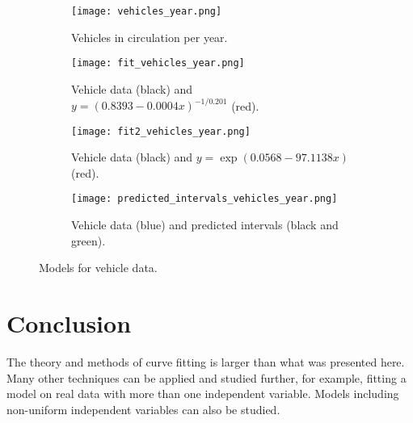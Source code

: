 \documentclass[letterpaper, 10 pt, conference]{article}
\begin{document}
\begin{figure}
	\centering
	\begin{subfigure}{.45 \linewidth}
		\centering
		\texttt{[image: vehicles\_year.png]}
		\caption{Vehicles in circulation per year.}
		\label{fig:vehicles}
	\end{subfigure}
	\hfill
	\begin{subfigure}{0.45\linewidth}
		\texttt{[image: fit\_vehicles\_year.png]}
		\caption{Vehicle data (black) and $y = (0.8393 - 0.0004 x)^{-1/0.201}$ (red).}
		\label{fig:fit_vehicles}
	\end{subfigure}
	\hfill
	\begin{subfigure}{0.45\linewidth}
		\texttt{[image: fit2\_vehicles\_year.png]}
		\caption{Vehicle data (black) and $y = \exp(0.0568 - 97.1138x)$ (red).}
		\label{fig:fit2_vehicles}
	\end{subfigure}
	\hfill
	\begin{subfigure}{0.45\linewidth}
		\texttt{[image: predicted\_intervals\_vehicles\_year.png]}
		\caption{Vehicle data (blue) and predicted intervals (black and green).}
		\label{fig:predicted_intervals_vehicles}
	\end{subfigure}
	\caption{Models for vehicle data.} 
	\label{fig:models_vehicles}
\end{figure}

\section{Conclusion}
The theory and methods of curve fitting is larger than what was presented here. Many other techniques can be applied and studied further, for example, fitting a model on real data with more than one independent variable. Models including non-uniform independent variables can also be studied.






\end{document}
